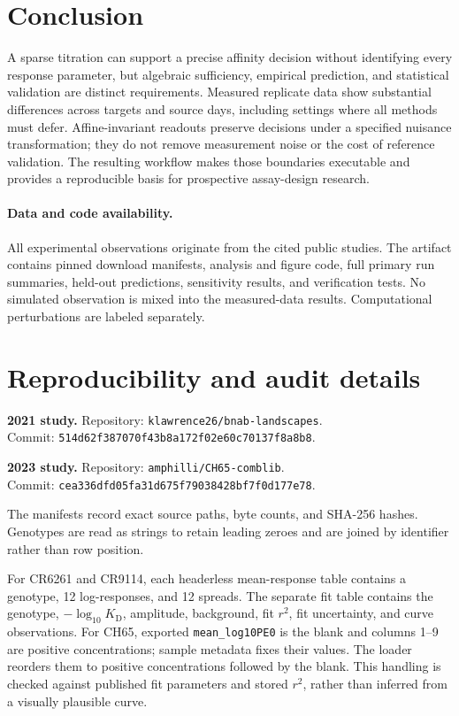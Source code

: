 \documentclass[11pt,letterpaper]{article}
\newcommand{\KD}{K_{\mathrm D}}
\begin{document}
\section{Conclusion}
A sparse titration can support a precise affinity decision without identifying every response parameter, but algebraic sufficiency, empirical prediction, and statistical validation are distinct requirements. Measured replicate data show substantial differences across targets and source days, including settings where all methods must defer. Affine-invariant readouts preserve decisions under a specified nuisance transformation; they do not remove measurement noise or the cost of reference validation. The resulting workflow makes those boundaries executable and provides a reproducible basis for prospective assay-design research.

\paragraph{Data and code availability.}
All experimental observations originate from the cited public studies. The artifact contains pinned download manifests, analysis and figure code, full primary run summaries, held-out predictions, sensitivity results, and verification tests. No simulated observation is mixed into the measured-data results. Computational perturbations are labeled separately.




\appendix
\section{Reproducibility and audit details}\label{app:repro}
\noindent\textbf{2021 study.} Repository: \texttt{klawrence26/bnab-landscapes}.\\
Commit: \texttt{514d62f387070f43b8a172f02e60c70137f8a8b8}.

\noindent\textbf{2023 study.} Repository: \texttt{amphilli/CH65-comblib}.\\
Commit: \texttt{cea336dfd05fa31d675f79038428bf7f0d177e78}.

The manifests record exact source paths, byte counts, and SHA-256 hashes. Genotypes are read as strings to retain leading zeroes and are joined by identifier rather than row position.

For CR6261 and CR9114, each headerless mean-response table contains a genotype, 12 log-responses, and 12 spreads. The separate fit table contains the genotype, $-\log_{10}\KD$, amplitude, background, fit $r^2$, fit uncertainty, and curve observations. For CH65, exported \texttt{mean\_log10PE0} is the blank and columns 1--9 are positive concentrations; sample metadata fixes their values. The loader reorders them to positive concentrations followed by the blank. This handling is checked against published fit parameters and stored $r^2$, rather than inferred from a visually plausible curve.
\end{document}
